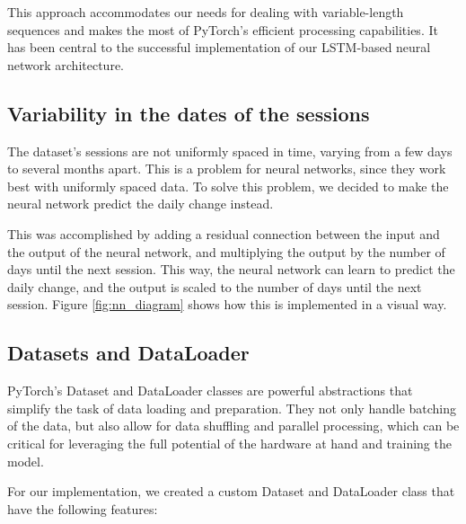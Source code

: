 This approach accommodates our needs for dealing with variable-length sequences
and makes the most of PyTorch's efficient processing capabilities. It has been
central to the successful implementation of our LSTM-based neural network
architecture.

\subsection{Variability in the dates of the sessions}

The dataset's sessions are not uniformly spaced in time, varying from a few
days to several months apart. This is a problem for neural networks, since they
work best with uniformly spaced data. To solve this problem, we decided to make
the neural network predict the daily change instead.

This was accomplished by adding a residual connection between the input and the
output of the neural network, and multiplying the output by the number of days
until the next session. This way, the neural network can learn to predict the
daily change, and the output is scaled to the number of days until the next
session. Figure \ref{fig:nn_diagram} shows how this is implemented in a visual
way.

\subsection{Datasets and DataLoader}

PyTorch's Dataset and DataLoader classes are powerful abstractions that
simplify the task of data loading and preparation. They not only handle
batching of the data, but also allow for data shuffling and parallel
processing, which can be critical for leveraging the full potential of the
hardware at hand and training the model.

For our implementation, we created a custom Dataset and DataLoader class that
have the following features:

